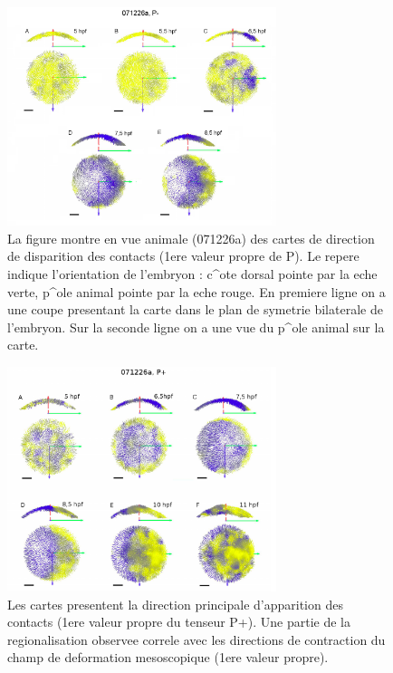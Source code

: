\begin{figure}
\begin{center}
\includegraphics[width=0.7\textwidth]{../../images/Reconstruction/these_lombardot/p205_lost_contact.png}
\end{center}
\caption{La figure montre en vue animale (071226a) des cartes de direction de disparition des contacts (1ere valeur propre de P). Le repere indique l'orientation de l'embryon : c^ote dorsal pointe par la  eche verte, p^ole animal pointe par la  eche rouge. En premiere ligne on a une coupe presentant la carte dans le plan de symetrie bilaterale de l'embryon. Sur la seconde ligne on a une vue du p^ole animal sur la carte.}
\label{these_lombardot_p205_lost_contact}
\end{figure}
\begin{figure}
\begin{center}
\includegraphics[width=0.7\textwidth]{../../images/Reconstruction/these_lombardot/p209_new_contact.png}
\end{center}
\caption{Les cartes presentent la direction principale d'apparition des contacts (1ere valeur propre du tenseur P+). Une partie de la regionalisation observee correle avec les directions de contraction du champ de deformation mesoscopique (1ere valeur propre).}
\label{these_lombardot_p209_new_contact}
\end{figure}

